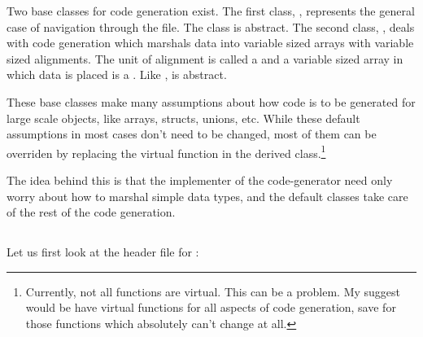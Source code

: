 Two base classes for code generation exist.  The first class, \mus{},
represents the general case of navigation through the \cpres{} file.  The
\mus{} class is abstract.  The second class, \mmus{}, deals with code
generation which marshals data into variable sized arrays with variable sized
alignments.  The unit of alignment is called a \chunk{} and a variable sized
array in which data is placed is a \glob{}.  Like \mus{}, \mmus{} is abstract.

These base classes make many assumptions about how code is to be generated for
large scale objects, like arrays, structs, unions, etc.  While these default
assumptions in most cases don't need to be changed, most of them can be
overriden by replacing the virtual function in the derived
class.\footnote{Currently, not all functions are virtual.  This can be a
problem.  My suggest would be have virtual functions for all aspects of code
generation, save for those functions which absolutely can't change at all.}

The idea behind this is that the implementer of the code-generator need only
worry about how to marshal simple data types, and the default classes take care
of the rest of the code generation.


\subsection{\mus{}}

Let us first look at the header file for \mus{}:

